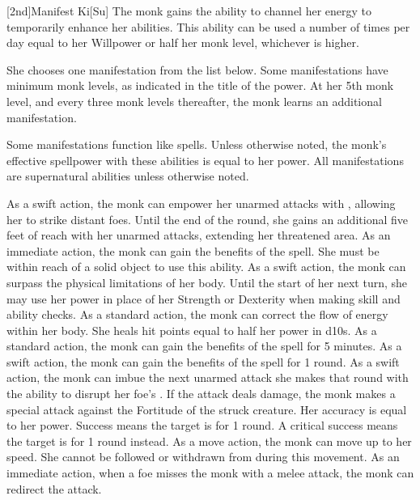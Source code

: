 [2nd]{Manifest Ki}[Su]
The monk gains the ability to channel her \ki energy to temporarily enhance her abilities.
This ability can be used a number of times per day equal to her Willpower or half her monk level, whichever is higher.

She chooses one \ki manifestation from the list below.
Some \ki manifestations have minimum monk levels, as indicated in the title of the power.
At her 5th monk level, and every three monk levels thereafter, the monk learns an additional \ki manifestation.

Some \ki manifestations function like spells.
Unless otherwise noted, the monk's effective spellpower with these abilities is equal to her \ki power.
All \ki manifestations are supernatural abilities unless otherwise noted.

As a swift action, the monk can empower her unarmed attacks with \ki, allowing her to strike distant foes.
Until the end of the round, she gains an additional five feet of reach with her unarmed attacks, extending her threatened area.
As an immediate action, the monk can gain the benefits of the  spell.
She must be within reach of a solid object to use this ability.
As a swift action, the monk can surpass the physical limitations of her body.
Until the start of her next turn, she may use her \ki power in place of her Strength or Dexterity when making skill and ability checks.
As a standard action, the monk can correct the flow of energy within her body.
She heals hit points equal to half her \ki power in d10s.
As a standard action, the monk can gain the benefits of the  spell for 5 minutes.
As a swift action, the monk can gain the benefits of the  spell for 1 round.
As a swift action, the monk can imbue the next unarmed attack she makes that round with the ability to disrupt her foe's \ki.
If the attack deals damage, the monk makes a special attack against the Fortitude of the struck creature.
Her accuracy is equal to her \ki power.
Success means the target is \staggered for 1 round.
A critical success means the target is \stunned for 1 round instead.
\norepeatnotes
{}
As a move action, the monk can move up to her speed.
She cannot be followed or withdrawn from during this movement.
As an immediate action, when a foe misses the monk with a melee attack, the monk can redirect the attack.
